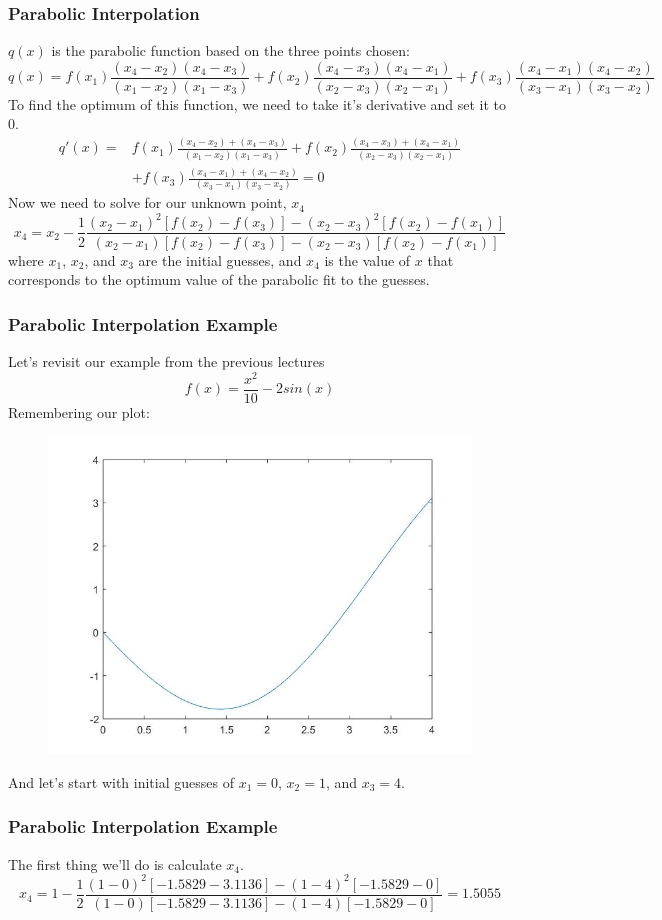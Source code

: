 \documentclass{if-beamer}
\begin{document}
\begin{frame}[t]
	\frametitle{Parabolic Interpolation}
	$q(x)$ is the parabolic function based on the three points chosen:
	$$q(x) = f(x_1)\frac{(x_4-x_2)(x_4-x_3)}{(x_1-x_2)(x_1-x_3)}+f(x_2)\frac{(x_4-x_3)(x_4-x_1)}{(x_2-x_3)(x_2-x_1)}+f(x_3)\frac{(x_4-x_1)(x_4-x_2)}{(x_3-x_1)(x_3-x_2)} $$
	To find the optimum of this function, we need to take it's derivative and set it to 0.
	\begin{align*}
		q'(x) = & f(x_1)\frac{(x_4-x_2)+(x_4-x_3)}{(x_1-x_2)(x_1-x_3)}+f(x_2)\frac{(x_4-x_3)+(x_4-x_1)}{(x_2-x_3)(x_2-x_1)}\\
		&+f(x_3)\frac{(x_4-x_1)+(x_4-x_2)}{(x_3-x_1)(x_3-x_2)} = 0
	\end{align*}
	Now we need to solve for our unknown point, $x_4$
	$$x_4 = x_2 - \frac{1}{2}\frac{(x_2-x_1)^2[f(x_2)-f(x_3)]-(x_2-x_3)^2[f(x_2)-f(x_1)]}{(x_2-x_1)[f(x_2)-f(x_3)]-(x_2-x_3)[f(x_2)-f(x_1)]}$$
	where $x_1$, $x_2$, and $x_3$ are the initial guesses, and $x_4$ is the value of $x$ that corresponds to the
	optimum value of the parabolic fit to the guesses.
\end{frame}

\begin{frame}
	\frametitle{Parabolic Interpolation Example}
	Let's revisit our example from the previous lectures
	$$f(x) = \frac{x^2}{10}-2sin(x)$$
    Remembering our plot:
	\begin{figure}
		\centering
		\includegraphics[width=.65\textwidth]{figures/plot}
	\end{figure}
And let's start with initial guesses of $x_1 = 0$, $x_2 = 1$, and $x_3 = 4$.
\end{frame}

\begin{frame}[t]
\frametitle{Parabolic Interpolation Example}
The first thing we'll do is calculate $x_4$.
$$ x_4 = 1-\frac{1}{2}\frac{(1-0)^2[-1.5829-3.1136]-(1-4)^2[-1.5829-0]}{(1-0)[-1.5829-3.1136]-(1-4)[-1.5829-0]}=1.5055$$	
\end{frame}
\end{document}
